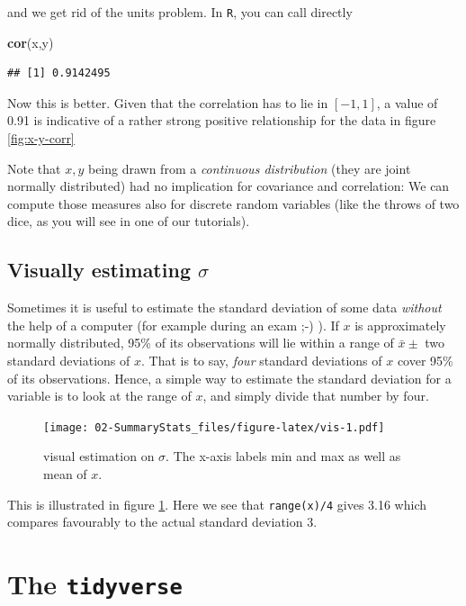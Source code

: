 \documentclass[]{book}
\newenvironment{Shaded}{\begin{snugshade}}{\end{snugshade}}
\newcommand{\KeywordTok}[1]{\textcolor[rgb]{0.13,0.29,0.53}{\textbf{#1}}}
\newcommand{\NormalTok}[1]{#1}
\begin{document}
and we get rid of the units problem. In \texttt{R}, you can call
directly

\begin{Shaded}
\begin{Highlighting}[]
\KeywordTok{cor}\NormalTok{(x,y)}
\end{Highlighting}
\end{Shaded}

\begin{verbatim}
## [1] 0.9142495
\end{verbatim}

Now this is better. Given that the correlation has to lie in \([-1,1]\),
a value of 0.91 is indicative of a rather strong positive relationship
for the data in figure \ref{fig:x-y-corr}

Note that \(x,y\) being drawn from a \emph{continuous distribution}
(they are joint normally distributed) had no implication for covariance
and correlation: We can compute those measures also for discrete random
variables (like the throws of two dice, as you will see in one of our
tutorials).

\subsection{\texorpdfstring{Visually estimating
\(\sigma\)}{Visually estimating \textbackslash{}sigma}}\label{visually-estimating-sigma}

Sometimes it is useful to estimate the standard deviation of some data
\emph{without} the help of a computer (for example during an exam ;-) ).
If \(x\) is approximately normally distributed, 95\% of its observations
will lie within a range of \(\bar{x}\pm\) two standard deviations of
\(x\). That is to say, \emph{four} standard deviations of \(x\) cover
95\% of its observations. Hence, a simple way to estimate the standard
deviation for a variable is to look at the range of \(x\), and simply
divide that number by four.

\begin{figure}
\centering
\texttt{[image: 02-SummaryStats\_files/figure-latex/vis-1.pdf]}
\caption{\label{fig:vis}visual estimation on \(\sigma\). The x-axis labels
min and max as well as mean of \(x\).}
\end{figure}

This is illustrated in figure \ref{fig:vis}. Here we see that
\texttt{range(x)/4} gives 3.16 which compares favourably to the actual
standard deviation 3.

\section{\texorpdfstring{The
\texttt{tidyverse}}{The tidyverse}}\label{the-tidyverse}
\end{document}
